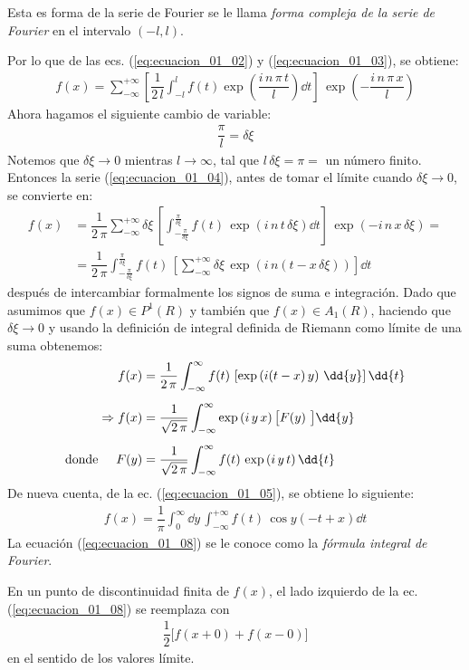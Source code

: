 Esta es forma de la serie de Fourier se le llama \emph{forma compleja de la serie de Fourier} en el intervalo $(-l , l)$.
\par
Por lo que de las ecs. (\ref{eq:ecuacion_01_02}) y (\ref{eq:ecuacion_01_03}), se obtiene:
\begin{align}
f(x) = \sum_{-\infty}^{+\infty} \left[ \dfrac{1}{2 \, l} \int_{-l}^{l} f(t) \exp \left( \dfrac{i \, n \, \pi \, t}{l} \right) \dd{t} \right] \, \exp \left( - \dfrac{i \, n \, \pi \, x}{l} \right)
\label{eq:ecuacion_01_04}
\end{align}
Ahora hagamos el siguiente cambio de variable:
\begin{align*}
\dfrac{\pi}{l} = \delta \xi
\end{align*}
Notemos que $\delta \xi \to 0$ mientras $l \to \infty$, tal que $l \, \delta \xi = \pi =$ un número finito. Entonces la serie (\ref{eq:ecuacion_01_04}), antes de tomar el límite cuando $\delta \xi \to 0$, se convierte en:
\begin{align*}
f(x) &= \dfrac{1}{2 \, \pi} \sum_{-\infty}^{+\infty} \delta \xi \, \left[ \int_{-\frac{\pi}{\delta \xi}}^{\frac{\pi}{\delta \xi}} f(t) \, \exp \left( i \, n \, t \, \delta \xi \right) \dd{t} \right] \, \exp \left( - i \, n \, x \, \delta \xi \right) = \\[0.5em]
&= \dfrac{1}{2 \, \pi} \int_{-\frac{\pi}{\delta \xi}}^{\frac{\pi}{\delta \xi}} f(t) \, \left[ \sum_{-\infty}^{+\infty} \delta \xi \, \exp \left( i \, n (t - x \, \delta \xi) \right) \right] \dd{t}
\end{align*}
después de intercambiar formalmente los signos de suma e integración. Dado que asumimos que  $f (x) \in P^{1} (R)$ y también que $f (x) \in A_{1} (R)$, haciendo que $\delta \xi \to 0$ y usando la definición de integral definida de Riemann como límite de una suma obtenemos:
\begin{align}
f(x) &= \dfrac{1}{2 \, \pi} \int_{-\infty}^{\infty} f(t) \, \left[ \exp \left( i (t - x) \, y \right) \, \dd{y} \right] \dd{t} \label{eq:ecuacion_01_05} \\[0.5em]
\Rightarrow f(x) &= \dfrac{1}{\sqrt{2 \, \pi}} \int_{-\infty}^{\infty} \exp \left( i \, y \, x \right) \big[ F(y) \big] \dd{y} \label{eq:ecuacion_01_06} \\[0.5em]
\mbox{donde} \hspace{0.5cm} F(y) &= \dfrac{1}{\sqrt{2 \, \pi}} \int_{-\infty}^{\infty} f(t) \, \exp \left( i \, y \, t \right) \dd{t} \label{eq:ecuacion_01_07}
\end{align}
De nueva cuenta, de la ec. (\ref{eq:ecuacion_01_05}), se obtiene lo siguiente:
\begin{align}
f(x) = \dfrac{1}{\pi} \int_{0}^{\infty}  \dd{y} \, \int_{-\infty}^{+\infty} f(t) \, \cos y(-t + x) \dd{t} \label{eq:ecuacion_01_08}
\end{align}
La ecuación (\ref{eq:ecuacion_01_08}) se le conoce como la \emph{fórmula integral de Fourier}.
\par
En un punto de discontinuidad finita de $f(x)$, el lado izquierdo de la ec. (\ref{eq:ecuacion_01_08}) se reemplaza con
\begin{align*}
\dfrac{1}{2} \big[ f(x + 0) + f(x - 0) \big]
\end{align*}
en el sentido de los valores límite.
